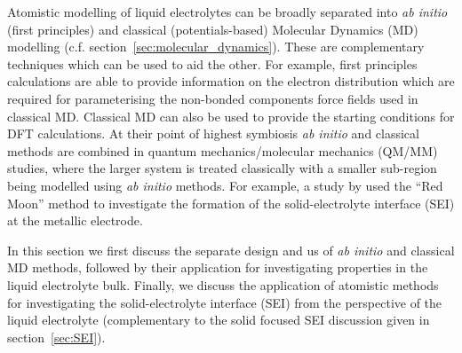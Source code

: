 \documentclass[../main.tex]{subfiles}
\begin{document}
Atomistic modelling of liquid electrolytes can be broadly separated into \textit{ab initio} (first principles) and classical (potentials-based) Molecular Dynamics (MD) modelling (c.f. section~\ref{sec:molecular_dynamics}). These are complementary techniques which can be used to aid the other. For example, first principles calculations are able to provide information on the electron distribution which are required for parameterising the non-bonded components force fields used in classical MD. Classical MD can also be used to provide the starting conditions for DFT calculations. At their point of highest symbiosis \textit{ab initio} and classical methods are combined in quantum mechanics/molecular mechanics (QM/MM) studies, where the larger system is treated classically with a smaller sub-region being modelled using \textit{ab initio} methods. For example, a study by \citeauthor{Fujie_2018} used the ``Red Moon'' method to investigate the formation of the solid-electrolyte interface (SEI) at the metallic electrode\cite{Fujie_2018}.

In this section we first discuss the separate design and us of \textit{ab initio} and classical MD methods, followed by their application for investigating properties in the liquid electrolyte bulk. Finally, we discuss the application of atomistic methods for investigating the solid-electrolyte interface (SEI) from the perspective of the liquid electrolyte (complementary to the solid focused SEI discussion given in section~\ref{sec:SEI}).
\end{document}
